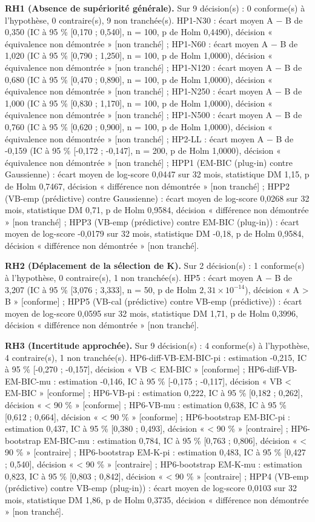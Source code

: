 \textbf{RH1 (Absence de supériorité générale).} Sur 9 décision(s) : 0 conforme(s) à l'hypothèse, 0 contraire(s), 9 non tranchée(s). HP1-N30 : écart moyen A $-$ B de 0,350 (IC à 95 \% [0,170 ; 0,540], n = 100, p de Holm 0,4490), décision « équivalence non démontrée » [non tranché] ; HP1-N60 : écart moyen A $-$ B de 1,020 (IC à 95 \% [0,790 ; 1,250], n = 100, p de Holm 1,0000), décision « équivalence non démontrée » [non tranché] ; HP1-N120 : écart moyen A $-$ B de 0,680 (IC à 95 \% [0,470 ; 0,890], n = 100, p de Holm 1,0000), décision « équivalence non démontrée » [non tranché] ; HP1-N250 : écart moyen A $-$ B de 1,000 (IC à 95 \% [0,830 ; 1,170], n = 100, p de Holm 1,0000), décision « équivalence non démontrée » [non tranché] ; HP1-N500 : écart moyen A $-$ B de 0,760 (IC à 95 \% [0,620 ; 0,900], n = 100, p de Holm 1,0000), décision « équivalence non démontrée » [non tranché] ; HP2-LL : écart moyen A $-$ B de -0,159 (IC à 95 \% [-0,172 ; -0,147], n = 200, p de Holm 1,0000), décision « équivalence non démontrée » [non tranché] ; HPP1 (EM-BIC (plug-in) contre Gaussienne) : écart moyen de log-score 0,0447 sur 32 mois, statistique DM 1,15, p de Holm 0,7467, décision « différence non démontrée » [non tranché] ; HPP2 (VB-emp (prédictive) contre Gaussienne) : écart moyen de log-score 0,0268 sur 32 mois, statistique DM 0,71, p de Holm 0,9584, décision « différence non démontrée » [non tranché] ; HPP3 (VB-emp (prédictive) contre EM-BIC (plug-in)) : écart moyen de log-score -0,0179 sur 32 mois, statistique DM -0,18, p de Holm 0,9584, décision « différence non démontrée » [non tranché].

\textbf{RH2 (Déplacement de la sélection de K).} Sur 2 décision(s) : 1 conforme(s) à l'hypothèse, 0 contraire(s), 1 non tranchée(s). HP5 : écart moyen A $-$ B de 3,207 (IC à 95 \% [3,076 ; 3,333], n = 50, p de Holm $2{,}31 \times 10^{-14}$), décision « A > B » [conforme] ; HPP5 (VB-cal (prédictive) contre VB-emp (prédictive)) : écart moyen de log-score 0,0595 sur 32 mois, statistique DM 1,71, p de Holm 0,3996, décision « différence non démontrée » [non tranché].

\textbf{RH3 (Incertitude approchée).} Sur 9 décision(s) : 4 conforme(s) à l'hypothèse, 4 contraire(s), 1 non tranchée(s). HP6-diff-VB-EM-BIC-pi : estimation -0,215, IC à 95 \% [-0,270 ; -0,157], décision « VB < EM-BIC » [conforme] ; HP6-diff-VB-EM-BIC-mu : estimation -0,146, IC à 95 \% [-0,175 ; -0,117], décision « VB < EM-BIC » [conforme] ; HP6-VB-pi : estimation 0,222, IC à 95 \% [0,182 ; 0,262], décision « < 90 \% » [conforme] ; HP6-VB-mu : estimation 0,638, IC à 95 \% [0,612 ; 0,664], décision « < 90 \% » [conforme] ; HP6-bootstrap EM-BIC-pi : estimation 0,437, IC à 95 \% [0,380 ; 0,493], décision « < 90 \% » [contraire] ; HP6-bootstrap EM-BIC-mu : estimation 0,784, IC à 95 \% [0,763 ; 0,806], décision « < 90 \% » [contraire] ; HP6-bootstrap EM-K-pi : estimation 0,483, IC à 95 \% [0,427 ; 0,540], décision « < 90 \% » [contraire] ; HP6-bootstrap EM-K-mu : estimation 0,823, IC à 95 \% [0,803 ; 0,842], décision « < 90 \% » [contraire] ; HPP4 (VB-emp (prédictive) contre VB-emp (plug-in)) : écart moyen de log-score 0,0103 sur 32 mois, statistique DM 1,86, p de Holm 0,3735, décision « différence non démontrée » [non tranché].

